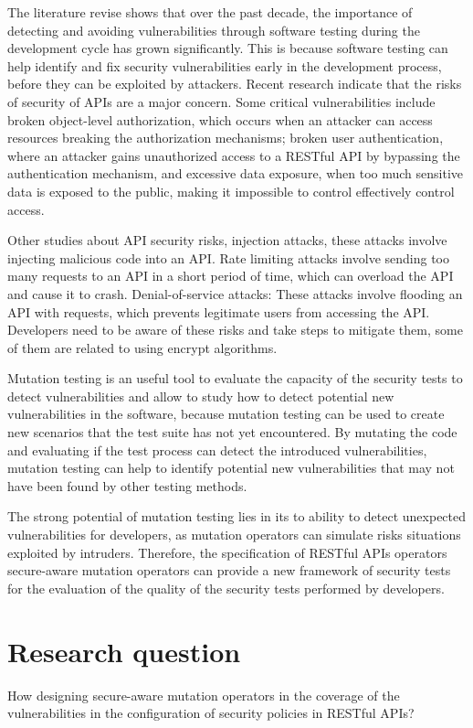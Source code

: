 The literature revise shows that over the past decade, the importance of detecting and avoiding vulnerabilities through software testing\cite{8564344} during the development cycle has grown significantly.  This is because software testing can help identify and fix security vulnerabilities early in the development process, before they can be exploited by attackers. Recent research indicate that the risks of security of APIs are a major concern. Some critical vulnerabilities include broken object-level authorization, which occurs when an attacker can access resources breaking the authorization mechanisms; broken user authentication, where an attacker gains unauthorized access to a RESTful API by bypassing the authentication mechanism, and excessive data exposure, when too much sensitive data is exposed to the public, making it impossible to control effectively control access.

Other studies about API security risks\cite{zenodo}, injection attacks, these attacks involve injecting malicious code into an API. Rate limiting attacks involve sending too many requests to an API in a short period of time, which can overload the API and cause it to crash. Denial-of-service attacks: These attacks involve flooding an API with requests, which prevents legitimate users from accessing the API. Developers need to be aware of these risks and take steps to mitigate them, some of them are related to using encrypt algorithms.

Mutation testing is an useful tool to evaluate the capacity of the security tests to detect vulnerabilities and allow to study how to detect potential new vulnerabilities in the software, because mutation testing can be used to create new scenarios that the test suite has not yet encountered. By mutating the code and evaluating if the test process can detect the introduced vulnerabilities, mutation testing can help to identify potential new vulnerabilities that may not have been found by other testing methods.

The strong potential of mutation testing lies in its to ability to detect unexpected vulnerabilities for developers, as mutation operators can simulate risks situations exploited by intruders. Therefore, the specification of RESTful APIs operators secure-aware mutation operators can provide a new framework of security tests for the evaluation of the quality of the security tests performed by developers.

\section{Research question}

How designing secure-aware mutation operators in the coverage of the vulnerabilities in the configuration of security policies in RESTful APIs?

